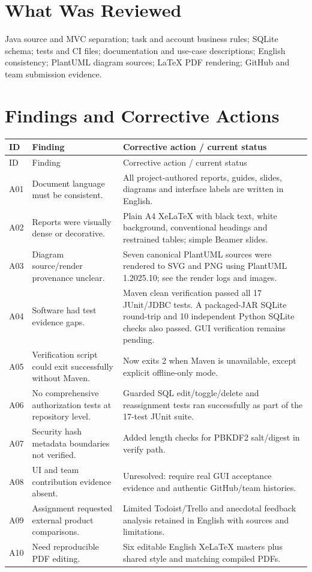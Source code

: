 \documentclass[11pt,a4paper]{article}
\begin{document}
\section{What Was Reviewed}
Java source and MVC separation; task and account business rules; SQLite schema; tests and CI files; documentation and use-case descriptions; English consistency; PlantUML diagram sources; LaTeX PDF rendering; GitHub and team submission evidence.

\section{Findings and Corrective Actions}
\small
\begin{longtable}{p{12mm}p{48mm}p{81mm}}
\toprule ID & Finding & Corrective action / current status \\ \midrule\endfirsthead
\toprule ID & Finding & Corrective action / current status \\ \midrule\endhead
A01 & Document language must be consistent. & All project-authored reports, guides, slides, diagrams and interface labels are written in English.\\
A02 & Reports were visually dense or decorative. & Plain A4 XeLaTeX with black text, white background, conventional headings and restrained tables; simple Beamer slides.\\
A03 & Diagram source/render provenance unclear. & Seven canonical PlantUML sources were rendered to SVG and PNG using PlantUML 1.2025.10; see the render logs and images.\\
A04 & Software had test evidence gaps. & Maven clean verification passed all 17 JUnit/JDBC tests. A packaged-JAR SQLite round-trip and 10 independent Python SQLite checks also passed. GUI verification remains pending.\\
A05 & Verification script could exit successfully without Maven. & Now exits 2 when Maven is unavailable, except explicit offline-only mode.\\
A06 & No comprehensive authorization tests at repository level. & Guarded SQL edit/toggle/delete and reassignment tests ran successfully as part of the 17-test JUnit suite.\\
A07 & Security hash metadata boundaries not verified. & Added length checks for PBKDF2 salt/digest in verify path.\\
A08 & UI and team contribution evidence absent. & Unresolved: require real GUI acceptance evidence and authentic GitHub/team histories.\\
A09 & Assignment requested external product comparisons. & Limited Todoist/Trello and anecdotal feedback analysis retained in English with sources and limitations.\\
A10 & Need reproducible PDF editing. & Six editable English XeLaTeX masters plus shared style and matching compiled PDFs.\\
\bottomrule
\end{longtable}
\normalsize
\end{document}
